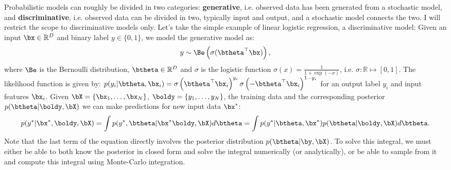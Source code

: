 Probabilistic models can roughly be divided in two categories: \textbf{generative}, i.e. observed data has been generated from a stochastic model, and \textbf{discriminative}, i.e. observed data can be divided in two, typically input and output, and a stochastic model connects the two.
I will restrict the scope to discriminative models only.
Let's take the simple example of linear logistic regression, a discriminative model:
Given an input $\bx \in \mathbb{R}^D$ and binary label $y\in \{ 0, 1\}$, we model the generative model as:
\begin{align}
    y \sim \Be\left(\sigma(\btheta^\top \bx)\right),
\end{align}
where $\Be$ is the Bernoulli distribution, $\btheta\in\mathbb{R}^D$ and $\sigma$ is the logistic function $\sigma(x) = \frac{1}{1 + \exp(-x)}$, i.e. $\sigma : \mathbb{R} \mapsto [0, 1]$.
The likelihood function is given by: $p(y_i|\btheta,\bx_i) =\sigma\left(\btheta^\top \bx_i\right)^{y_i}\sigma\left(-\btheta^\top \bx_i\right)^{1-y_i}$ for an output label $y_i$ and input features $\bx_i$.
Given $\bX = \{\bx_1,\ldots,\bx_N\}$, $\boldy = \{y_1,\ldots,y_N\}$, the training data and the corresponding posterior $p(\btheta|\boldy, \bX)$ we can make predictions for new input data $\bx^*$:
\begin{align}
p(y^*|\bx^*,\boldy,\bX) = \int p(y^*, \btheta|\bx^*\boldy, \bX)d\btheta = \int p(y^*|\btheta,\bx^*) p(\btheta|\boldy,\bX)d\btheta.
\end{align}
Note that the last term of the equation directly involves the posterior distribution $p(\btheta|\by,\bX)$.
To solve this integral, we must either be able to both know the posterior in closed form and solve the integral numerically (or analytically), or be able to sample from it and compute this integral using Monte-Carlo integration.


